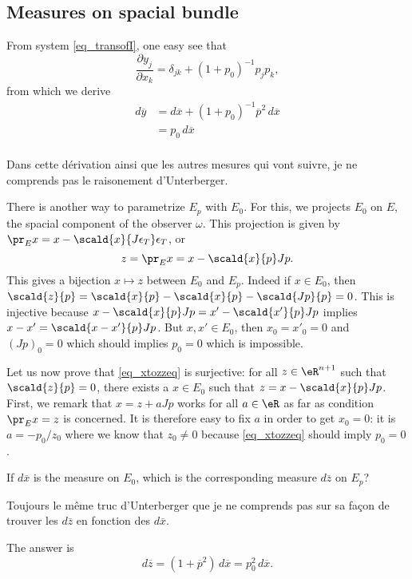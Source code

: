 \subsection{Measures on spacial bundle}

From system \eqref{eq_transofI}, one easy see that
\[
	\frac{ \partial y_j }{ \partial x_k }=\delta_{jk}+(1+p_0)^{-1}p_jp_k,
\]
from which we derive
\begin{equation}
	\begin{split}
		d\overline{y}&=d\overline{x}+(1+p_0)^{-1}\overline{p}^2\,d\overline{x}\\
		&=p_0\,d\overline{x}\\
	\end{split}
\end{equation}


\begin{probleme}
	Dans cette dérivation ainsi que les autres mesures qui vont suivre, je ne comprends pas le raisonement d'Unterberger.
\end{probleme}

There is another way to parametrize $E_p$ with $E_0$. For this, we projects $E_0$ on $E$, the spacial component of the observer $\omega$. This projection is given by $\pr_Ex=x-\scald{ x }{ J\epsilon_T }\epsilon_T$, or
\begin{equation} \label{eq_xtozzeq}
	z=\pr_Ex=x-\scald{ x }{ p }Jp.
\end{equation}
This gives a bijection $x\mapsto z$ between $E_0$ and $E_p$. Indeed if $x\in E_0$, then $\scald{ z }{ p }=\scald{ x }{ p }-\scald{ x }{ p }-\scald{ Jp }{ p }=0$. This is injective because $x-\scald{ x }{ p }Jp=x'-\scald{ x' }{ p }Jp$ implies $x-x'=\scald{ x-x' }{ p }Jp$. But $x,x'\in E_0$, then $x_0=x'_0=0$ and $(Jp)_0=0$ which should implies $p_0=0$ which is impossible.

Let us now prove that \eqref{eq_xtozzeq} is surjective: for all $z\in\eR^{n+1}$ such that $\scald{ z }{ p }=0$, there exists a $x\in E_0$ such that $z=x-\scald{ x }{ p }Jp$. First, we remark that $x=z+aJp$ works for all $a\in \eR$ as far as condition $\pr_Ex=z$ is concerned. It is therefore easy to fix $a$ in order to get $x_0=0$: it is $a=-p_0/z_0$ where we know that $z_0\neq 0$ because \eqref{eq_xtozzeq} should imply $p_0=0$.


If $d\overline{x}$ is the measure on $E_0$, which is the corresponding measure $d\overline{ z }$ on $E_p$?

\begin{probleme}
	Toujours le même truc d'Unterberger que je ne comprends pas sur sa façon de trouver les $d\overline{ z }$ en fonction des $d\overline{ x }$.
\end{probleme}
The answer is
\begin{equation}
	d\overline{ z }=(1+\overline{p}^2)\,d\overline{x}=p_0^2\,d\overline{x}.
\end{equation}

